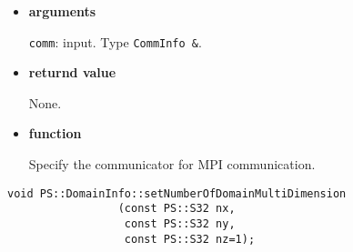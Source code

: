 \begin{itemize}

\item {\bf arguments}

{\tt comm}: input. Type {\tt CommInfo \&}.


\item {\bf returnd value}

None.

\item {\bf function}

Specify the communicator for MPI communication.








\end{itemize}



\begin{screen}
\begin{verbatim}
void PS::DomainInfo::setNumberOfDomainMultiDimension
                 (const PS::S32 nx,
                  const PS::S32 ny,
                  const PS::S32 nz=1);
\end{verbatim}
\end{screen}


